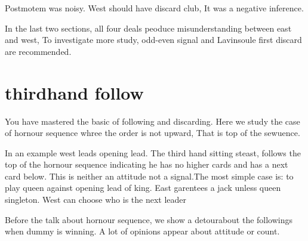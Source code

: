 Postmotem was noisy. West should have discard club, It was a 
negative inference.

In the last two sections, all four deals peoduce misunderstanding
between east and west, To investigate more study, odd-even signal and
Lavinsoule first discard are recommended.


\section{thirdhand follow}

You have mastered the basic of following and discarding. Here
we study the case of hornour sequence whree the order is not
upward, That is top of the sewuence.

In an example west leads opening lead. The third hand sitting steast, 
follows the top of the hornour sequence indicating he has no higher
cards and has a next card below. This is neither  an attitude not
a signal.The most simple case is: to play queen against opening lead
of king. East garentees a jack unless queen singleton.
West can choose who is the next leader

Before the talk about hornour sequence, we show a detourabout
the followings when dummy is winning. A lot of opinions appear
about attitude or count.


